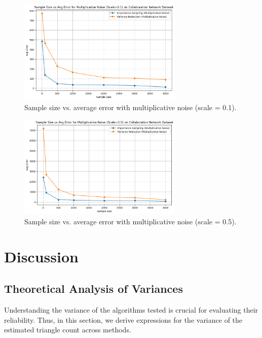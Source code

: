 \documentclass[11pt]{article}
\begin{document}
\begin{figure}[H]
    \centering
    \includegraphics[width=0.7\textwidth]{plots/simulated/percent_error_vs_sample_size_comparison_multiplicative_0.1.png}
    \caption{Sample size vs. average error with multiplicative noise (scale = 0.1).}
    \label{fig:multiplicative_noise_01}
\end{figure}

\begin{figure}[H]
    \centering
    \includegraphics[width=0.7\textwidth]{plots/simulated/percent_error_vs_sample_size_comparison_multiplicative_0.5.png}
    \caption{Sample size vs. average error with multiplicative noise (scale = 0.5).}
    \label{fig:multiplicative_noise_05}
\end{figure}

\newpage

\section{Discussion}

\subsection{Theoretical Analysis of Variances}

Understanding the variance of the algorithms tested is crucial for evaluating their reliability.
Thus, in this section, we derive expressions for the variance of the estimated triangle count across methods.
\end{document}
